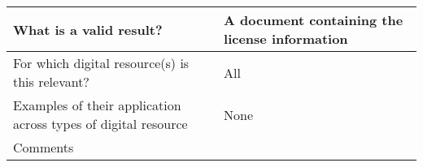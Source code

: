 \documentclass[english]{article}
\begin{document}
\begin{longtable}{|p{5cm}|p{9cm}|}
\\



\hline
What is a valid result? &  


A document containing the license information

\\



\hline
For which digital resource(s) is this relevant? &  All\\



\hline
Examples of their application across types of digital resource &  None

\\



\hline

Comments & 


\\
\hline

\end{longtable}





\newpage
\end{document}
